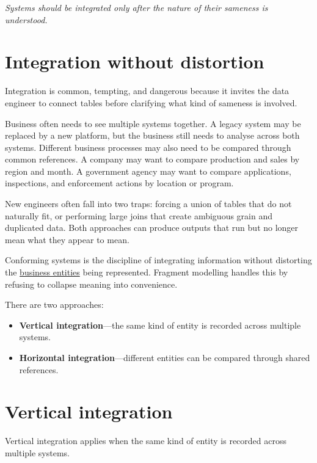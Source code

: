 \documentclass[10pt,openany,10pt]{book}
\providecommand{\tightlist}{%
  \setlength{\itemsep}{0pt}\setlength{\parskip}{0pt}}
\begin{document}
\emph{Systems should be integrated only after the nature of their
sameness is understood.}

\section{Integration without
distortion}\label{integration-without-distortion}

Integration is common, tempting, and dangerous because it invites the
data engineer to connect tables before clarifying what kind of sameness
is involved.

Business often needs to see multiple systems together. A legacy system
may be replaced by a new platform, but the business still needs to
analyse across both systems. Different business processes may also need
to be compared through common references. A company may want to compare
production and sales by region and month. A government agency may want
to compare applications, inspections, and enforcement actions by
location or program.

New engineers often fall into two traps: forcing a union of tables that
do not naturally fit, or performing large joins that create ambiguous
grain and duplicated data. Both approaches can produce outputs that run
but no longer mean what they appear to mean.

Conforming systems is the discipline of integrating information without
distorting the
\hyperref[docs-creating-information-mapping-the-data-world]{business
entities} being represented. Fragment modelling handles this by refusing
to collapse meaning into convenience.

There are two approaches:

\begin{itemize}
\tightlist
\item
  \textbf{Vertical integration}---the same kind of entity is recorded
  across multiple systems.
\item
  \textbf{Horizontal integration}---different entities can be compared
  through shared references.
\end{itemize}

\section{Vertical integration}\label{vertical-integration}

Vertical integration applies when the same kind of entity is recorded
across multiple systems.
\end{document}
